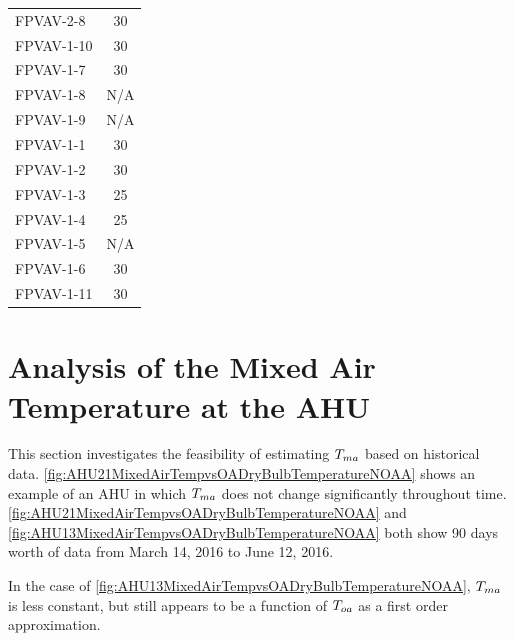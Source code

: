 \begin{table}[]
\begin{tabular}{lS}
FPVAV-2-8            & 30                              \\
FPVAV-1-10           & 30                              \\
FPVAV-1-7            & 30                              \\
FPVAV-1-8            & {N/A}                           \\
FPVAV-1-9            & {N/A}                           \\
FPVAV-1-1            & 30                              \\
FPVAV-1-2            & 30                              \\
FPVAV-1-3            & 25                              \\
FPVAV-1-4            & 25                              \\
FPVAV-1-5            & {N/A}                           \\
FPVAV-1-6            & 30                              \\
FPVAV-1-11           & 30               \\ \bottomrule
\end{tabular}
\end{table}




\section{Analysis of the Mixed Air Temperature at the AHU}

This section investigates the feasibility of estimating \(T_{ma}\) based on
historical data. \figref{}
\ref{fig:AHU21MixedAirTempvsOADryBulbTemperatureNOAA} shows an example of an
AHU in which \(T_{ma}\) does not change significantly throughout time. \figref{}
\ref{fig:AHU21MixedAirTempvsOADryBulbTemperatureNOAA} and
\ref{fig:AHU13MixedAirTempvsOADryBulbTemperatureNOAA} both show 90 days worth
of data from March 14, 2016 to June 12, 2016. 

In the case of \figref{}
\ref{fig:AHU13MixedAirTempvsOADryBulbTemperatureNOAA}, \(T_{ma}\) is less
constant, but still appears to be a function of \(T_{oa}\) as a first
order approximation. 


